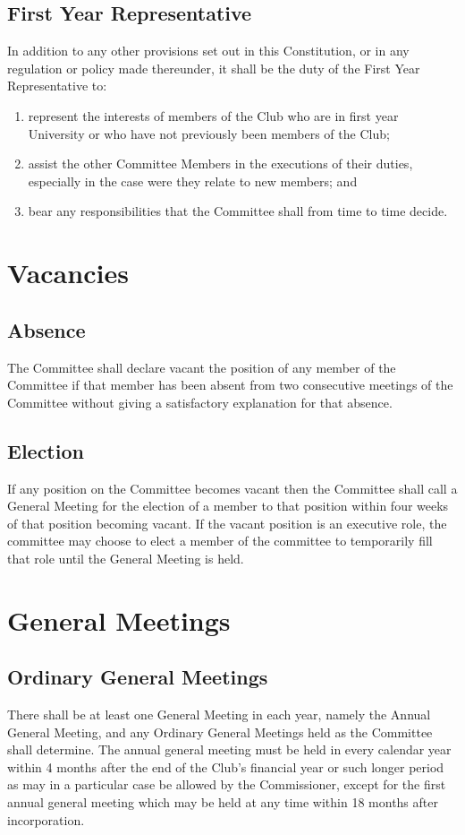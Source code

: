 \documentclass[11pt]{article} %
\begin{document}
\subsection{First Year Representative}
In addition to any other provisions set out in this Constitution, or in any regulation or policy made thereunder, it shall be the duty of the First Year Representative to:
\begin{enumerate}
	\item represent the interests of members of the Club who are in first year University or who have not previously been members of the Club;
	 \item assist the other Committee Members in the executions of their duties, especially in the case were they relate to new members; and
	\item bear any responsibilities that the Committee shall from time to time decide.
\end{enumerate}

\section{Vacancies}
\subsection{Absence}
The Committee shall declare vacant the position of any member of the Committee if that member has been absent from two consecutive meetings of the Committee without giving a satisfactory explanation for that absence.
\subsection{Election}
If any position on the Committee becomes vacant then the Committee shall call a General Meeting for the election of a member to that position within four weeks of that position becoming vacant.
If the vacant position is an executive role, the committee may choose to elect a member of the committee to temporarily fill that role until the General Meeting is held.

\section{General Meetings}
\subsection{Ordinary General Meetings}
There shall be at least one General Meeting in each year, namely the Annual General Meeting, and any Ordinary General Meetings held as the Committee shall determine. The annual general meeting must be held in every calendar year within 4 months after the end of the Club's financial year or such longer period as may in a particular case be allowed by the Commissioner, except for the first annual general meeting which may be held at any time within 18 months after incorporation.
\end{document}
